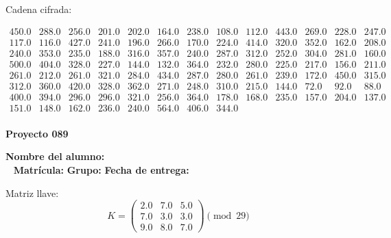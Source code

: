 \documentclass[12pt]{article}
\begin{document}
Cadena cifrada:
\begin{center}
$\begin{array}{lllllllllllll}
450.0 & 288.0 & 256.0 & 201.0 & 202.0 & 164.0 & 238.0 & 108.0 & 112.0 & 443.0 & 269.0 & 228.0 & 247.0\\
117.0 & 116.0 & 427.0 & 241.0 & 196.0 & 266.0 & 170.0 & 224.0 & 414.0 & 320.0 & 352.0 & 162.0 & 208.0\\
240.0 & 353.0 & 235.0 & 188.0 & 316.0 & 357.0 & 240.0 & 287.0 & 312.0 & 252.0 & 304.0 & 281.0 & 160.0\\
500.0 & 404.0 & 328.0 & 227.0 & 144.0 & 132.0 & 364.0 & 232.0 & 280.0 & 225.0 & 217.0 & 156.0 & 211.0\\
261.0 & 212.0 & 261.0 & 321.0 & 284.0 & 434.0 & 287.0 & 280.0 & 261.0 & 239.0 & 172.0 & 450.0 & 315.0\\
312.0 & 360.0 & 420.0 & 328.0 & 362.0 & 271.0 & 248.0 & 310.0 & 215.0 & 144.0 & 72.0 & 92.0 & 88.0\\
400.0 & 394.0 & 296.0 & 296.0 & 321.0 & 256.0 & 364.0 & 178.0 & 168.0 & 235.0 & 157.0 & 204.0 & 137.0\\
151.0 & 148.0 & 162.0 & 236.0 & 240.0 & 564.0 & 406.0 & 344.0\\
\end{array}$
\end{center}

\newpage


\textbf{Proyecto 089}

\textbf{Nombre del alumno:} \underline{\hspace{13cm}}\\\
\vspace{1cm}
\textbf{Matrícula:} \underline{\hspace{4cm}} \hspace{1cm}
\textbf{Grupo:} \underline{\hspace{2cm}}
\textbf{Fecha de entrega:} \underline{\hspace{2cm}}

\medskip

Matriz llave:
\[
K = \begin{pmatrix}
2.0 & 7.0 & 5.0\\
7.0 & 3.0 & 3.0\\
9.0 & 8.0 & 7.0
\end{pmatrix} \pmod{29}
\]
\end{document}

